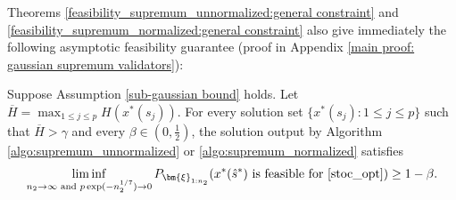 \documentclass[mnsc,blindrev]{informs4} %
\begin{document}

Theorems \ref{feasibility_supremum_unnormalized:general constraint} and \ref{feasibility_supremum_normalized:general constraint} also give immediately the following asymptotic feasibility guarantee (proof in Appendix \ref{main proof: gaussian supremum validators}):
\begin{corollary}\label{asymptotic feasibility:supremum + general constraint}
Suppose Assumption \ref{sub-gaussian bound} holds. Let $\overline{H}=\max_{1\leq j\leq p}H(x^*(s_j))$. For every solution set $\{x^*(s_j):1\leq j\leq p\}$ such that $\overline{H}>\gamma$ and every $\beta\in(0,\frac{1}{2})$, the solution output by Algorithm \ref{algo:supremum_unnormalized} or \ref{algo:supremum_normalized} satisfies
\begin{equation*}
\liminf_{n_2\to\infty\text{ and }p\exp(-n_2^{1/7})\to 0}P_{\bm{\xi}_{1:n_2}}(x^*(\hat s^*)\text{ is feasible for \eqref{stoc_opt}})\geq 1-\beta.
\end{equation*}
\end{corollary}
\end{document}
